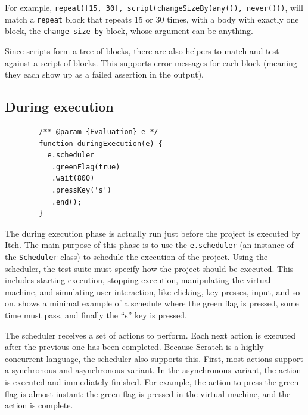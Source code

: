 \documentclass[../main]{subfiles}
\begin{document}
For example, \texttt{repeat([15, 30], script(changeSizeBy(any()), never()))}, will match a \texttt{repeat} block that repeats 15 or 30 times, with a body with exactly one block, the \texttt{change size by} block, whose argument can be anything.

Since scripts form a tree of blocks, there are also helpers to match and test against a script of blocks.
This supports error messages for each block (meaning they each show up as a failed assertion in the output).

\subsection{During execution}\label{subsec:during-execution}

\begin{listing}
    \begin{verbatim}
        /** @param {Evaluation} e */
        function duringExecution(e) {
          e.scheduler
           .greenFlag(true)
           .wait(800)
           .pressKey('s')
           .end();
        }
    \end{verbatim}
    \caption{An example of the during execution phase where the scheduler is used to first press the green flag, wait \qty{800}{\milli\second}, press the ``s'' key, and finally end execution.}\label{lst:itch-scheduler-example}
\end{listing}

The during execution phase is actually run just before the project is executed by Itch.
The main purpose of this phase is to use the \texttt{e.scheduler} (an instance of the \texttt{Scheduler} class) to schedule the execution of the project.
Using the scheduler, the test suite must specify how the project should be executed.
This includes starting execution, stopping execution, manipulating the virtual machine, and simulating user interaction, like clicking, key presses, input, and so on.
 shows a minimal example of a schedule where the green flag is pressed, some time must pass, and finally the ``s'' key is pressed.

The scheduler receives a set of actions to perform.
Each next action is executed after the previous one has been completed.
Because Scratch is a highly concurrent language, the scheduler also supports this.
First, most actions support a synchronous and asynchronous variant.
In the asynchronous variant, the action is executed and immediately finished.
For example, the action to press the green flag is almost instant: the green flag is pressed in the virtual machine, and the action is complete.
\end{document}
